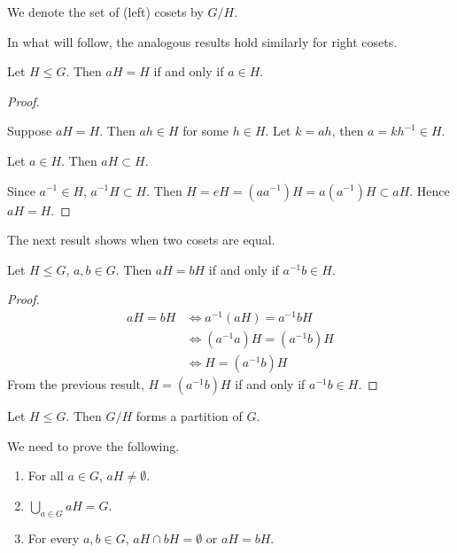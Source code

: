 \begin{notation}
We denote the set of (left) cosets by $G/H$.
\end{notation}

In what will follow, the analogous results hold similarly for right cosets.

\begin{lemma}
Let $H\le G$. Then $aH=H$ if and only if $a\in H$.
\end{lemma}

\begin{proof} \

\fbox{$\implies$} Suppose $aH=H$. Then $ah\in H$ for some $h\in H$. Let $k=ah$, then $a=kh^{-1}\in H$.

\fbox{$\impliedby$} Let $a\in H$. Then $aH\subset H$.

Since $a^{-1}\in H$, $a^{-1}H\subset H$. Then $H=eH=(aa^{-1})H=a(a^{-1})H\subset aH$. Hence $aH=H$.
\end{proof}

The next result shows when two cosets are equal.

\begin{lemma}
Let $H\le G$, $a,b\in G$. Then $aH=bH$ if and only if $a^{-1}b\in H$.
\end{lemma}

\begin{proof}
\begin{align*}
aH=bH&\iff a^{-1}(aH)=a^{-1}bH\\
&\iff (a^{-1}a)H=(a^{-1}b)H\\
&\iff H=(a^{-1}b)H
\end{align*}
From the previous result, $H=(a^{-1}b)H$ if and only if $a^{-1}b\in H$.
\end{proof}

\begin{proposition}
Let $H\le G$. Then $G/H$ forms a partition of $G$.
\end{proposition}

We need to prove the following.
\begin{enumerate}[label=(\roman*)]
\item For all $a\in G$, $aH\neq\emptyset$.
\item $\bigcup_{a\in G}aH=G$.
\item For every $a,b\in G$, $aH\cap bH=\emptyset$ or $aH=bH$.
\end{enumerate}

